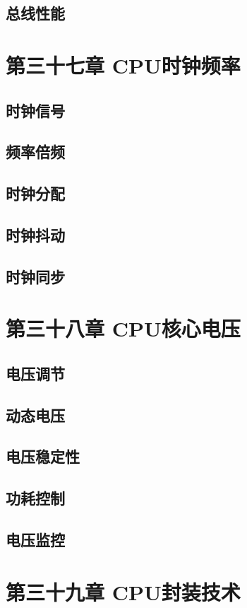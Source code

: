 \documentclass[12pt,UTF8]{ctexbook}
\begin{document}
\section{总线性能}

\chapter{第三十七章 CPU时钟频率}

\section{时钟信号}
\section{频率倍频}
\section{时钟分配}
\section{时钟抖动}
\section{时钟同步}

\chapter{第三十八章 CPU核心电压}

\section{电压调节}
\section{动态电压}
\section{电压稳定性}
\section{功耗控制}
\section{电压监控}

\chapter{第三十九章 CPU封装技术}
\end{document}
